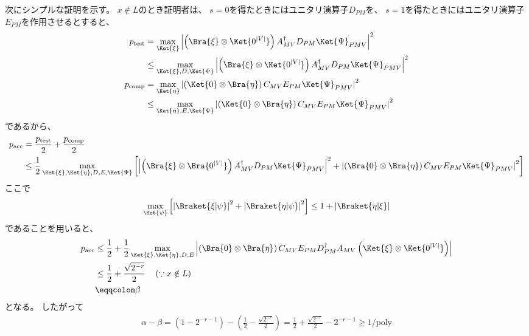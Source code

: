 \documentclass[a4paper, 10pt]{jsarticle}
\begin{document}
次にシンプルな証明を示す。
$x \notin L$のとき証明者は、
$s=0$を得たときにはユニタリ演算子$D_{PM}$を、
$s=1$を得たときにはユニタリ演算子$E_{PM}$を作用させるとすると、
\begin{align}
	p_\mathrm{test}
	&= \max_{\Ket{\xi}} \left|
		\left( \Bra{\xi} \otimes \Ket{0^{|V|}} \right)
		A_{MV}^\dagger D_{PM} \Ket{\Psi}_{PMV}
	\right|^2 \\
	&\leq \max_{\Ket{\xi}, D, \Ket{\Psi}} \left|
		\left( \Bra{\xi} \otimes \Ket{0^{|V|}} \right)
		A_{MV}^\dagger D_{PM} \Ket{\Psi}_{PMV}
	\right|^2 \\
	p_\mathrm{comp}
	&= \max_{\Ket{\eta}} \left|
		\left( \Ket{0} \otimes \Bra{\eta} \right)
		C_{MV} E_{PM} \Ket{\Psi}_{PMV}
	\right|^2 \\
	&\leq \max_{\Ket{\eta}, E, \Ket{\Psi}} \left|
		\left( \Ket{0} \otimes \Bra{\eta} \right)
		C_{MV} E_{PM} \Ket{\Psi}_{PMV}
	\right|^2
\end{align}
であるから、
\begin{align}
	p_\mathrm{acc}
	&= \frac{p_\mathrm{test}}{2} + \frac{p_\mathrm{comp}}{2} \\
	&\leq \frac{1}{2} \max_{\Ket{\xi}, \Ket{\eta}, D, E, \Ket{\Psi}}
	\left[ \left|
		\left( \Bra{\xi} \otimes \Bra{0^{|V|}} \right)
		A_{MV}^\dagger D_{PM} \Ket{\Psi}_{PMV}
	\right|^2 + \left|
		\left( \Bra{0} \otimes \Bra{\eta} \right)
		C_{MV} E_{PM} \Ket{\Psi}_{PMV}
	\right|^2 \right]
\end{align}
ここで
\begin{align}
	\max_{\Ket{\psi}} \left[ 
		\left| \Braket{\xi | \psi} \right|^2
		+ \left| \Braket{\eta | \psi} \right|^2
	 \right]
	 \leq 1 + \left| \Braket{\eta | \xi} \right|
\end{align}
であることを用いると、
\begin{align}
	p_\mathrm{acc}
	&\leq \frac{1}{2} + \frac{1}{2} \max_{\Ket{\xi}, \Ket{\eta}, D, E}
	\left|
		\left( \Bra{0} \otimes \Bra{\eta} \right)
		C_{MV} E_{PM} D_{PM}^\dagger A_{MV}
		\left( \Ket{\xi} \otimes \Ket{0^{|V|}} \right)
	\right| \\
	&\leq \frac{1}{2} + \frac{\sqrt{2^{-r}}}{2} \quad
	\left( \because x \notin L \right) \\
	&\eqqcolon \beta
\end{align}
となる。
したがって
\begin{align}
	\alpha - \beta
	= \left( 1 - 2^{-r-1} \right)
	- \left( \frac{1}{2} - \frac{\sqrt{2^{-r}}}{2} \right)
	= \frac{1}{2} + \frac{\sqrt{2^{-r}}}{2} - 2^{-r-1}
	\geq 1/\mathrm{poly}
\end{align}
\end{document}
